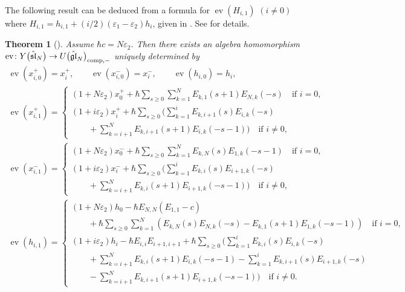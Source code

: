 \documentclass[10pt,a4paper]{amsart}
\newtheorem{thm}{Theorem}[section]
\theoremstyle{definition}
\numberwithin{equation}{section}
\DeclareMathOperator{\ev}{ev}
\newcommand{\ve}{\varepsilon}
\newcommand{\affY}{Y\big(\affsl\big)}
\newcommand{\gl}{\mathfrak{gl}}
\newcommand{\affsl}{\hat{\mathfrak{sl}}_N}
\begin{document}
The following result can be deduced from a formula for $\ev(H_{i,1})$ $(i \neq 0)$ where $H_{i,1}=h_{i,1} + (i/2)(\ve_1-\ve_2)h_i$, given in \cite[Section~6, pp.~462--463]{MR2323534}. See \cite{kodera_evaluation} for details.
\begin{thm}[\cite{MR2323534, kodera_evaluation}]Assume $\hbar c = N \ve_2$. Then there exists an algebra homomorphism $\ev \colon \affY \to U\big(\hat{\gl}_N\big)_{{\rm comp},-}$ uniquely determined by
\begin{gather*}
\ev(x_{i,0}^{+}) = x_{i}^{+}, \qquad \ev(x_{i,0}^{-}) = x_{i}^{-},\qquad \ev(h_{i,0}) = h_{i},\\
\ev(x_{i,1}^{+}) = \begin{cases}
(1+ N \varepsilon_2) x_{0}^{+} + \hbar \displaystyle\sum_{s \geq 0} \sum_{k=1}^N E_{k,1}(s+1) E_{N,k}(-s) \quad \text{if $i = 0$},\\
(1+ i \varepsilon_2) x_{i}^{+} + \hbar \displaystyle\sum_{s \geq 0} \bigg( \sum_{k=1}^i E_{k,i+1}(s) E_{i,k}(-s)\\
\qquad{} + \displaystyle \sum_{k=i+1}^N E_{k,i+1}(s+1) E_{i,k}(-s-1) \bigg) \quad \text{if $i \neq 0$},
\end{cases}\\
\ev(x_{i,1}^-) = \begin{cases}
(1+ N \varepsilon_2) x_{0}^{-} + \hbar \displaystyle\sum_{s \geq 0} \sum_{k=1}^N E_{k,N}(s) E_{1,k}(-s-1)\quad \text{if $i = 0$},\\
(1+ i \varepsilon_2) x_{i}^{-} + \hbar \displaystyle\sum_{s \geq 0} \bigg( \sum_{k=1}^i E_{k,i}(s) E_{i+1,k}(-s) \\
\qquad {} + \displaystyle\sum_{k=i+1}^N E_{k,i}(s+1) E_{i+1,k}(-s-1) \bigg) \quad \text{if $i \neq 0$},
\end{cases}\\
\ev(h_{i,1}) = \begin{cases}
(1+ N \varepsilon_2) h_{0} - \hbar E_{N,N} (E_{1,1}-c) \\
\qquad {}+ \hbar \displaystyle\sum_{s \geq 0} \sum_{k=1}^{N} ( E_{k,N}(s) E_{N,k}(-s) - E_{k,1}(s+1) E_{1,k}(-s-1) ) \quad \text{if $i = 0$},\\
(1+ i \varepsilon_2) h_{i} - \hbar E_{i,i}E_{i+1,i+1}+ \hbar \displaystyle\sum_{s \geq 0} \bigg( \sum_{k=1}^{i} E_{k,i}(s) E_{i,k}(-s) \\
\qquad{}+ \displaystyle\sum_{k=i+1}^{N} E_{k,i}(s+1) E_{i,k}(-s-1) - \displaystyle\sum_{k=1}^{i}E_{k,i+1}(s) E_{i+1,k}(-s) \\
\qquad {} - \displaystyle\sum_{k=i+1}^{N} E_{k,i+1}(s+1) E_{i+1,k}(-s-1) \bigg)\quad \text{if $i \neq 0$}.
\end{cases}
\end{gather*}
\end{thm}
\end{document}
